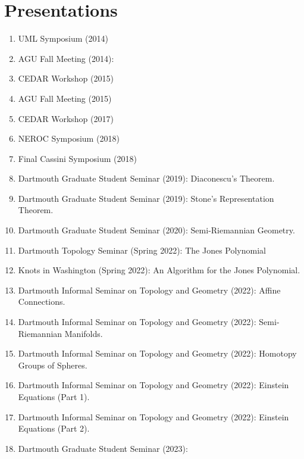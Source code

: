 \documentclass[a4paper,sans]{moderncv}
\begin{document}
    \section{Presentations}
        \begin{enumerate}
            \item UML Symposium (2014)
            \item AGU Fall Meeting (2014):
            \item CEDAR Workshop (2015)
            \item AGU Fall Meeting (2015)
            \item CEDAR Workshop (2017)
            \item NEROC Symposium (2018)
            \item Final Cassini Symposium (2018)
            \item
                Dartmouth Graduate Student Seminar (2019):
                Diaconescu's Theorem.
            \item
                Dartmouth Graduate Student Seminar (2019):
                Stone's Representation Theorem.
            \item
                Dartmouth Graduate Student Seminar (2020):
                Semi-Riemannian Geometry.
            \item
                Dartmouth Topology Seminar (Spring 2022):
                The Jones Polynomial
            \item
                Knots in Washington (Spring 2022):
                An Algorithm for the Jones Polynomial.
            \item
                Dartmouth Informal Seminar on Topology and Geometry (2022):
                Affine Connections.
            \item
                Dartmouth Informal Seminar on Topology and Geometry (2022):
                Semi-Riemannian Manifolds.
            \item
                Dartmouth Informal Seminar on Topology and Geometry (2022):
                Homotopy Groups of Spheres.
            \item
                Dartmouth Informal Seminar on Topology and Geometry (2022):
                Einstein Equations (Part 1).
            \item
                Dartmouth Informal Seminar on Topology and Geometry (2022):
                Einstein Equations (Part 2).
            \item
                Dartmouth Graduate Student Seminar (2023):

\end{enumerate}
\end{document}

